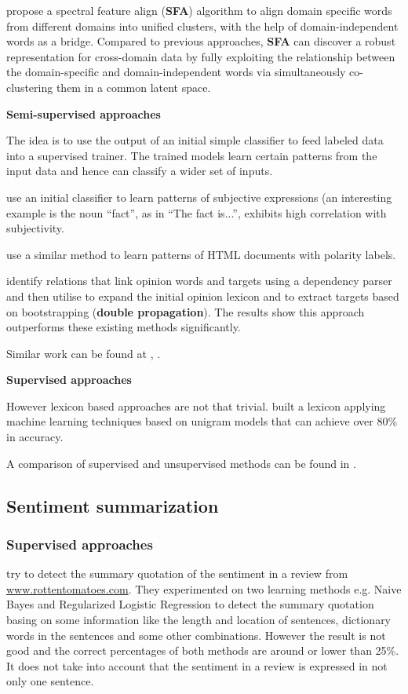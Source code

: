 \documentclass{article}
\begin{document}
\begin{multicols}{2}
            \citet{Pan2010} propose a spectral feature align (\textbf{SFA}) 
algorithm to align domain specific words from different domains into unified 
clusters, with the help of domain-independent words as a bridge. Compared to 
previous approaches, \textbf{SFA} can discover a robust representation for 
cross-domain data by fully exploiting the relationship between the domain-specific
and domain-independent words via simultaneously co-clustering them in a common
latent space.
      
        \textbf{Semi-supervised approaches}

          The idea is to use the output of an initial simple classifier to feed
  labeled data into a supervised trainer. The trained models learn
  certain patterns from the input data and hence can classify a wider set of
  inputs.

            \cite{Riloff2003} use an initial classifier to learn patterns
  of subjective expressions (an interesting example is the noun ``fact'', as in
  ``The fact is...'', exhibits high correlation with subjectivity.
            
            \cite{Kaji2006} use a similar method to learn patterns of HTML
  documents with polarity labels.
            
            \citet{Qiu2010} identify relations that link opinion words and targets
using a dependency parser and then utilise to expand the initial opinion lexicon
and to extract targets based on bootstrapping (\textbf{double propagation}).
The results show this approach outperforms these existing methods significantly.

            Similar work can be found at \cite{Wiebea2005}, \cite{Riloff2003a}.

        \textbf{Supervised approaches}
            
            However lexicon based approaches are not that trivial.
  \citet{Pang2002} built a lexicon applying machine learning techniques based on
  unigram models that can achieve over 80\% in accuracy.

            A comparison of supervised and unsupervised methods can be found in
  \cite{Chaovalit2005}.

  \subsection{Sentiment summarization}
    \subsubsection{Supervised approaches}
        \citet{Beineke2004} try to detect the summary quotation of the sentiment 
in a review from \url{www.rottentomatoes.com}. They experimented on two learning 
methods e.g. Naive Bayes and Regularized Logistic Regression to detect the summary
quotation basing on some information like the length and location of sentences,
dictionary words in the sentences and some other combinations. However the
result is not good and the correct percentages of both methods are around or
lower than 25\%. It does not take into account that the sentiment in a review is
expressed in not only one sentence.         


\end{multicols}
\end{document}
